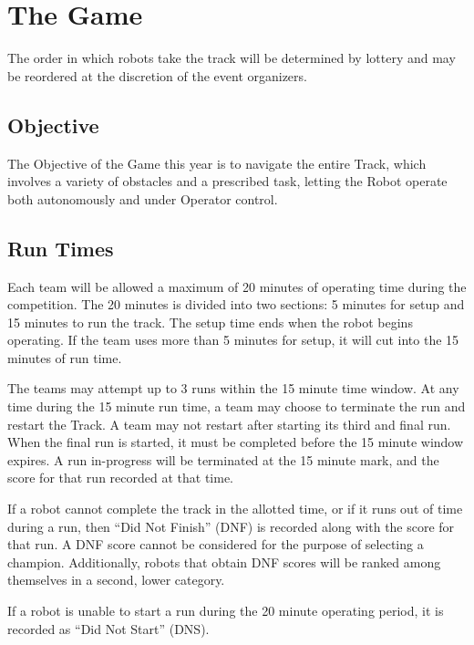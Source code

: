 \section{The Game}
The order in which robots take the track will be determined by lottery and may be reordered at the discretion of the event organizers. 

\subsection{Objective}
The Objective of the Game this year is to navigate the entire Track, which involves a variety of obstacles and a prescribed task, letting the Robot operate both autonomously and under Operator control.

\subsection{Run Times}
Each team will be allowed a maximum of 20 minutes of operating time during the competition. The 20 minutes is divided into two sections: 5 minutes for setup and 15 minutes to run the track. The setup time ends when the robot begins operating. If the team uses more than 5 minutes for setup, it will cut into the 15 minutes of run time. 

The teams may attempt up to 3 runs within the 15 minute time window. At any time during the 15 minute run time, a team may choose to terminate the run and restart the Track. A team may not restart after starting its third and final run. When the final run is started, it must be completed before the 15 minute window expires. A run in-progress will be terminated at the 15 minute mark, and the score for that run recorded at that time.

If a robot cannot complete the track in the allotted time, or if it runs out of time during a run, then “Did Not Finish” (DNF) is recorded along with the score for that run. A DNF score cannot be considered for the purpose of selecting a champion. Additionally, robots that obtain DNF scores will be ranked among themselves in a second, lower category.

If a robot is unable to start a run during the 20 minute operating period, it is recorded as “Did Not Start” (DNS).

